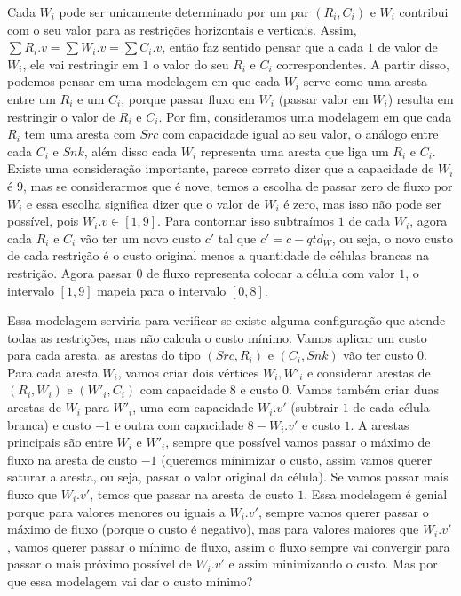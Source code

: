 Cada $W_i$ pode ser unicamente determinado por um par $(R_i,C_i)$ e $W_i$ contribui com o seu valor para as restrições horizontais e verticais. Assim, $\sum R_i.v = \sum W_i.v = \sum C_i.v$, então faz sentido pensar que a cada $1$ de valor de $W_i$, ele vai restringir em $1$ o valor do seu $R_i$ e $C_i$ correspondentes. A partir disso, podemos pensar em uma modelagem em que cada $W_i$ serve como uma aresta entre um $R_i$ e um $C_i$, porque passar fluxo em $W_i$ (passar valor em $W_i$) resulta em restringir o valor de $R_i$ e $C_i$. Por fim, consideramos uma modelagem em que cada $R_i$ tem uma aresta com $Src$ com capacidade igual ao seu valor, o análogo entre cada $C_i$ e $Snk$, além disso cada $W_i$ representa uma aresta que liga um $R_i$ e $C_i$. Existe uma consideração importante, parece correto dizer que a capacidade de $W_i$ é $9$, mas se considerarmos que é nove, temos a escolha de passar zero de fluxo por $W_i$ e essa escolha significa dizer que o valor de $W_i$ é zero, mas isso não pode ser possível, pois $W_i.v \in [1,9]$. Para contornar isso subtraímos $1$ de cada $W_i$, agora cada $R_i$ e $C_i$ vão ter um novo custo $c'$ tal que $c' = c - qtd_{W}$, ou seja, o novo custo de cada restrição é o custo original menos a quantidade de células brancas na restrição. Agora passar $0$ de fluxo representa colocar a célula com valor $1$, o intervalo $[1,9]$ mapeia para o intervalo $[0,8]$.

Essa modelagem serviria para verificar se existe alguma configuração que atende todas as restrições, mas não calcula o custo mínimo. Vamos aplicar um custo para cada aresta, as arestas do tipo $(Src,R_i)$ e $(C_i,Snk)$ vão ter custo $0$. Para cada aresta $W_i$, vamos criar dois vértices $W_i,W'_i$ e considerar arestas de $(R_i,W_i)$ e $(W'_i,C_i)$ com capacidade $8$ e custo $0$. Vamos também criar duas arestas de $W_i$ para $W'_i$, uma com capacidade $W_i.v'$ (subtrair $1$ de cada célula branca) e custo $-1$ e outra com capacidade $8-W_i.v'$ e custo $1$. A arestas principais são entre $W_i$ e $W'_i$, sempre que possível vamos passar o máximo de fluxo na aresta de custo $-1$ (queremos minimizar o custo, assim vamos querer saturar a aresta, ou seja, passar o valor original da célula). Se vamos passar mais fluxo que $W_i.v'$, temos que passar na aresta de custo $1$. Essa modelagem é genial porque para valores menores ou iguais a $W_i.v'$, sempre vamos querer passar o máximo de fluxo (porque o custo é negativo), mas para valores maiores que $W_i.v'$, vamos querer passar o mínimo de fluxo, assim o fluxo sempre vai convergir para passar o mais próximo possível de $W_i.v'$ e assim minimizando o custo. Mas por que essa modelagem vai dar o custo mínimo?

